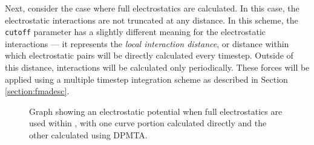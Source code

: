 Next, consider the case where full electrostatics are calculated.  In this
case, the electrostatic interactions are not truncated at any distance.  In
this scheme, the {\tt cutoff} parameter has a slightly different meaning
for the electrostatic interactions --- it represents
the {\it local interaction distance\/}, or distance within which electrostatic
pairs will be directly calculated every timestep.  Outside of this distance,
interactions will be calculated only periodically.  These forces
will be applied using a multiple timestep integration scheme as described in
Section \ref{section:fmadesc}.

\begin{figure}[htb]
  \caption[Graph of electrostatic split between short and long range forces]
  {\small Graph showing an electrostatic potential 
  when full electrostatics are used within \NAMD, 
  with one curve portion calculated directly 
  and the other calculated using DPMTA.}
  \label{fig:fmaOn}
\end{figure}

